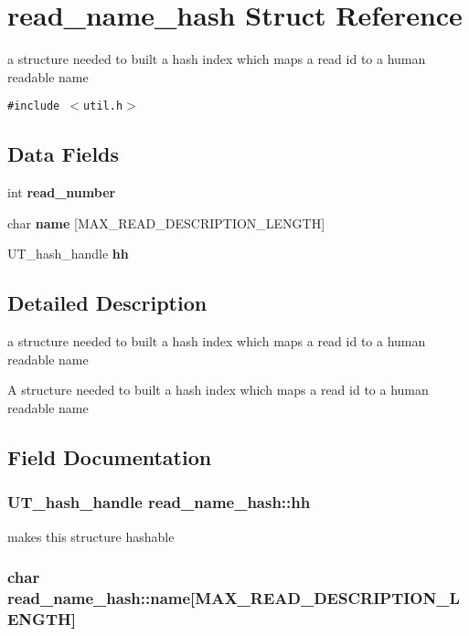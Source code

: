 \section{read\_\-name\_\-hash Struct Reference}
\label{structread__name__hash}
a structure needed to built a hash index which maps a read id to a human readable name  


{\tt \#include $<$util.h$>$}

\subsection*{Data Fields}
\begin{CompactItemize}
\item 
int {\bf read\_\-number}
\item 
char {\bf name} [MAX\_\-READ\_\-DESCRIPTION\_\-LENGTH]
\item 
UT\_\-hash\_\-handle {\bf hh}
\end{CompactItemize}


\subsection{Detailed Description}
a structure needed to built a hash index which maps a read id to a human readable name 

A structure needed to built a hash index which maps a read id to a human readable name 

\subsection{Field Documentation}
\subsubsection[{hh}]{\setlength{\rightskip}{0pt plus 5cm}UT\_\-hash\_\-handle {\bf read\_\-name\_\-hash::hh}}\label{structread__name__hash_e0678fc20a5ee49195a9095987bdc90c}


makes this structure hashable 
\subsubsection[{name}]{\setlength{\rightskip}{0pt plus 5cm}char {\bf read\_\-name\_\-hash::name}[MAX\_\-READ\_\-DESCRIPTION\_\-LENGTH]}\label{structread__name__hash_34080c435db710a4ab9d859f7e402429}


